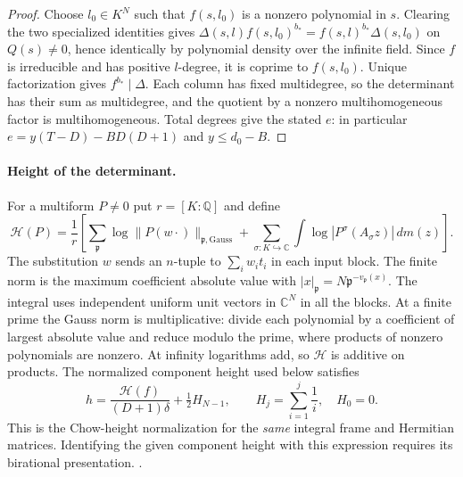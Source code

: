 \begin{proof}
Choose \(l_0\in K^N\) such that \(f(s,l_0)\) is a nonzero
polynomial in \(s\). Clearing the two specialized identities gives
\(\Delta(s,l) f(s,l_0)^{b_*}=f(s,l)^{b_*}\Delta(s,l_0)\)
on \(Q(s)\ne0\), hence identically by polynomial density over the
infinite field. Since \(f\) is irreducible and has positive
\(l\)-degree, it is coprime to \(f(s,l_0)\). Unique factorization
gives \(f^{b_*}\mid\Delta\). Each column has fixed multidegree, so
the determinant has their sum as multidegree, and the quotient by
a nonzero multihomogeneous factor is multihomogeneous. Total
degrees give the stated \(e\): in particular \(e=y(T-D)-BD(D+1)\)
and \(y\le d_0-B\).
\end{proof}

\paragraph{Height of the determinant.}
For a multiform \(P\ne0\) put \(r=[K:\mathbb Q]\) and define
\[
 \mathcal H(P)=\frac{1}{r}\left[
 \sum_{\mathfrak p}\log\|P(w\cdot)\|_{\mathfrak p,\mathrm{Gauss}}+
 \sum_{\sigma:K\hookrightarrow\mathbb C}
 \int\log|P^\sigma(A_\sigma z)|\,dm(z)\right].
\]
The substitution \(w\) sends an \(n\)-tuple to \(\sum_i w_i t_i\)
in each input block. The finite norm is the maximum coefficient
absolute value with \(|x|_{\mathfrak p}=N\mathfrak p^{-v_{\mathfrak p}(x)}\).
The integral uses independent uniform unit vectors in \(\mathbb C^N\)
in all the blocks. At a finite prime the Gauss norm is multiplicative:
divide each polynomial by a coefficient of largest absolute value and
reduce modulo the prime, where products of nonzero polynomials are
nonzero. At infinity logarithms add, so \(\mathcal H\) is additive
on products. The normalized component height used below satisfies
\[
 h=\frac{\mathcal H(f)}{(D+1)\delta}+\tfrac12 H_{N-1},
 \qquad H_j=\sum_{i=1}^{j}\frac1i,\quad H_0=0.
\]
This is the Chow-height normalization for the \emph{same} integral
frame and Hermitian matrices. Identifying the given component height
with this expression requires its birational presentation.
.

